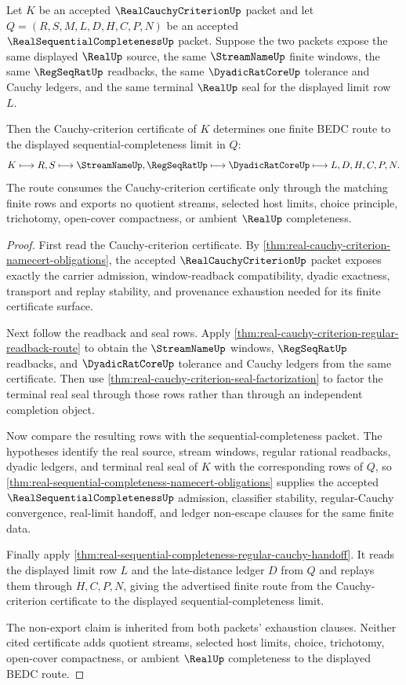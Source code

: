 \begin{theorem}
\label{thm:real-sequential-completeness-cauchycriterion-handoff}
Let $K$ be an accepted $\RealCauchyCriterionUp$ packet and let $Q=(R,S,M,L,D,H,C,P,N)$ be an accepted $\RealSequentialCompletenessUp$ packet. Suppose the two packets expose the same displayed $\RealUp$ source, the same $\StreamNameUp$ finite windows, the same $\RegSeqRatUp$ readbacks, the same $\DyadicRatCoreUp$ tolerance and Cauchy ledgers, and the same terminal $\RealUp$ seal for the displayed limit row $L$.

Then the Cauchy-criterion certificate of $K$ determines one finite BEDC route to the displayed sequential-completeness limit in $Q$:
$$
K\longmapsto R,S\longmapsto \StreamNameUp,\RegSeqRatUp\longmapsto \DyadicRatCoreUp\longmapsto L,D,H,C,P,N .
$$
The route consumes the Cauchy-criterion certificate only through the matching finite rows and exports no quotient streams, selected host limits, choice principle, trichotomy, open-cover compactness, or ambient $\RealUp$ completeness.
\end{theorem}
\begin{proof}
First read the Cauchy-criterion certificate. By \autoref{thm:real-cauchy-criterion-namecert-obligations}, the accepted $\RealCauchyCriterionUp$ packet exposes exactly the carrier admission, window-readback compatibility, dyadic exactness, transport and replay stability, and provenance exhaustion needed for its finite certificate surface.

Next follow the readback and seal rows. Apply \autoref{thm:real-cauchy-criterion-regular-readback-route} to obtain the $\StreamNameUp$ windows, $\RegSeqRatUp$ readbacks, and $\DyadicRatCoreUp$ tolerance and Cauchy ledgers from the same certificate. Then use \autoref{thm:real-cauchy-criterion-seal-factorization} to factor the terminal real seal through those rows rather than through an independent completion object.

Now compare the resulting rows with the sequential-completeness packet. The hypotheses identify the real source, stream windows, regular rational readbacks, dyadic ledgers, and terminal real seal of $K$ with the corresponding rows of $Q$, so \autoref{thm:real-sequential-completeness-namecert-obligations} supplies the accepted $\RealSequentialCompletenessUp$ admission, classifier stability, regular-Cauchy convergence, real-limit handoff, and ledger non-escape clauses for the same finite data.

Finally apply \autoref{thm:real-sequential-completeness-regular-cauchy-handoff}. It reads the displayed limit row $L$ and the late-distance ledger $D$ from $Q$ and replays them through $H,C,P,N$, giving the advertised finite route from the Cauchy-criterion certificate to the displayed sequential-completeness limit.

The non-export claim is inherited from both packets' exhaustion clauses. Neither cited certificate adds quotient streams, selected host limits, choice, trichotomy, open-cover compactness, or ambient $\RealUp$ completeness to the displayed BEDC route.
\end{proof}

